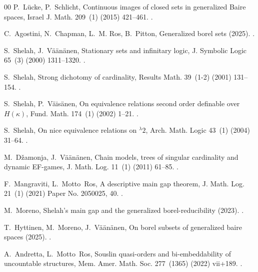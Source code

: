 \documentclass{amsart}
\numberwithin{equation}{section}
\newcommand{\1}{\mathbf{I}}
\newcommand{\2}{\mathbf{II}}
\theoremstyle{definition}
\theoremstyle{remark}
\begin{document}
\begin{thebibliography}{00}
P.~L\"ucke, P.~Schlicht, Continuous images of closed sets in generalized
  {B}aire spaces, Israel J. Math. 209~(1) (2015) 421--461.
\newblock \href {https://doi.org/10.1007/s11856-015-1224-2}
  {}.

C.~Agostini, N.~Chapman, L.~M. Ros, B.~Pitton, Generalized borel sets (2025).
\newblock \href {https://doi.org/10.48550/arXiv.2511.15663}
  {}.

S.~Shelah, J.~V\"a\"an\"anen, Stationary sets and infinitary logic, J. Symbolic
  Logic 65~(3) (2000) 1311--1320.
\newblock \href {https://doi.org/10.2307/2586701} {}.

S.~Shelah, Strong dichotomy of cardinality, Results Math. 39~(1-2) (2001)
  131--154.
\newblock \href {https://doi.org/10.1007/BF03322680}
  {}.

S.~Shelah, P.~V\"ais\"anen, On equivalence relations second order definable
  over {$H(\kappa)$}, Fund. Math. 174~(1) (2002) 1--21.
\newblock \href {https://doi.org/10.4064/fm174-1-1}
  {}.

S.~Shelah, On nice equivalence relations on {${}^\lambda 2$}, Arch. Math. Logic
  43~(1) (2004) 31--64.
\newblock \href {https://doi.org/10.1007/s00153-003-0183-1}
  {}.

M.~Džamonja, J.~V\"a\"an\"anen, Chain models, trees of singular cardinality
  and dynamic {EF}-games, J. Math. Log. 11~(1) (2011) 61--85.
\newblock \href {https://doi.org/10.1142/S0219061311001006}
  {}.

F.~Mangraviti, L.~Motto~Ros, A descriptive main gap theorem, J. Math. Log.
  21~(1) (2021) Paper No. 2050025, 40.
\newblock \href {https://doi.org/10.1142/S0219061320500257}
  {}.

M.~Moreno, Shelah's main gap and the generalized borel-reducibility (2023).
\newblock \href {https://doi.org/10.48550/arXiv.2308.07510}
  {}.

T.~Hyttinen, M.~Moreno, J.~Väänänen, On borel subsets of generalized baire
  spaces (2025).
\newblock \href {https://doi.org/10.48550/arXiv.2507.15427}
  {}.

A.~Andretta, L.~Motto~Ros, Souslin quasi-orders and bi-embeddability of
  uncountable structures, Mem. Amer. Math. Soc. 277~(1365) (2022) vii+189.
\newblock \href {https://doi.org/10.1090/memo/1365}
  {}.


\end{thebibliography}
\end{document}
